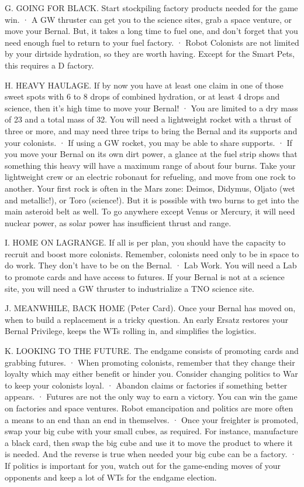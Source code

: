 \documentclass[a4paper]{book}
\begin{document}
G. GOING FOR BLACK. Start stockpiling factory products needed for the game win.
·       A GW thruster can get you to the science sites, grab a space venture, or move your Bernal. But, it takes a long time to fuel one, and don’t forget that you need enough fuel to return to your fuel factory.
·       Robot Colonists are not limited by your dirtside hydration, so they are worth having. Except for the Smart Pets, this requires a D factory.

H. HEAVY HAULAGE. If by now you have at least one claim in one of those sweet spots with 6 to 8 drops of combined hydration, or at least 4 drops and science, then it’s high time to move your Bernal!
·      You are limited to a dry mass of 23 and a total mass of 32. You will need a lightweight rocket with a thrust of three or more, and may need three trips to bring the Bernal and its supports and your colonists.
·       If using a GW rocket, you may be able to share supports.
·       If you move your Bernal on its own dirt power, a glance at the fuel strip shows that something this heavy will have a maximum range of about four burns. Take your lightweight crew or an electric robonaut for refueling, and move from one rock to another. Your first rock is often in the Mars zone: Deimos, Didymus, Oljato (wet and metallic!), or Toro (science!). But it is possible with two burns to get into the main asteroid belt as well. To go anywhere except 
Venus or Mercury, it will need nuclear power, as solar power has insufficient thrust and range.

I. HOME ON LAGRANGE. If all is per plan, you should have the capacity to recruit and boost more colonists. Remember, colonists need only to be in space to do work. They don’t have to be on the Bernal.
·       Lab Work. You will need a Lab to promote cards and have access to futures. If your Bernal is not at a science site, you will need a GW thruster to industrialize a TNO science site.

J. MEANWHILE, BACK HOME (Peter Card). Once your Bernal has moved on, when to build a replacement is a tricky question. An early Ersatz restores your Bernal Privilege, keeps the WTs rolling in, and simplifies the logistics.

K. LOOKING TO THE FUTURE. The endgame consists of promoting cards and grabbing futures.
·       When promoting colonists, remember that they change their loyalty which may either benefit or hinder you. Consider changing politics to War to keep your colonists loyal.
·       Abandon claims or factories if something better appears.
·       Futures are not the only way to earn a victory. You can win the game on factories and space ventures. Robot emancipation and politics are more often a means to an end than an end in themselves.
·       Once your freighter is promoted, swap your big cube with your small cubes, as required. For instance, manufacture a black card, then swap the big cube and use it to move the product to where it is needed. And the reverse is true when needed your big cube can be a factory.
·       If politics is important for you, watch out for the game-ending moves of your opponents and keep a lot of WTs for the endgame election.
\end{document}
